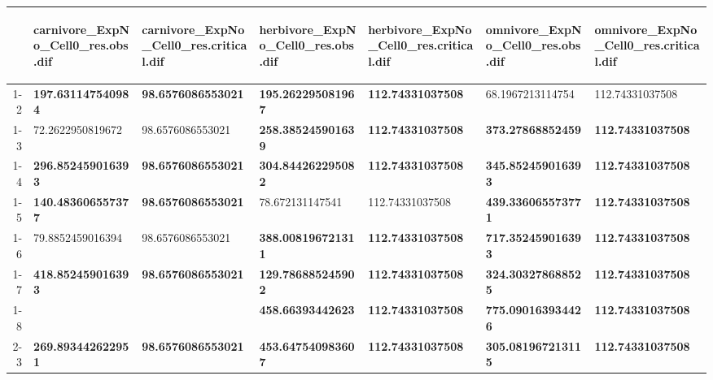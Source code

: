 \begin{table}[ht]
\centering
\begin{tabular}{rllllll}
  \toprule
 & \begin{sideways} carnivore_ExpNo_Cell0_res.obs.dif \end{sideways} & \begin{sideways} carnivore_ExpNo_Cell0_res.critical.dif \end{sideways} & \begin{sideways} herbivore_ExpNo_Cell0_res.obs.dif \end{sideways} & \begin{sideways} herbivore_ExpNo_Cell0_res.critical.dif \end{sideways} & \begin{sideways} omnivore_ExpNo_Cell0_res.obs.dif \end{sideways} & \begin{sideways} omnivore_ExpNo_Cell0_res.critical.dif \end{sideways} \\ 
  \midrule
1-2 & \textbf{197.631147540984} & \textbf{98.6576086553021} & \textbf{195.262295081967} & \textbf{112.74331037508} & 68.1967213114754 & 112.74331037508 \\ 
  1-3 & 72.2622950819672 & 98.6576086553021 & \textbf{258.385245901639} & \textbf{112.74331037508} & \textbf{373.27868852459} & \textbf{112.74331037508} \\ 
  1-4 & \textbf{296.852459016393} & \textbf{98.6576086553021} & \textbf{304.844262295082} & \textbf{112.74331037508} & \textbf{345.852459016393} & \textbf{112.74331037508} \\ 
  1-5 & \textbf{140.483606557377} & \textbf{98.6576086553021} & 78.672131147541 & 112.74331037508 & \textbf{439.336065573771} & \textbf{112.74331037508} \\ 
  1-6 & 79.8852459016394 & 98.6576086553021 & \textbf{388.008196721311} & \textbf{112.74331037508} & \textbf{717.352459016393} & \textbf{112.74331037508} \\ 
  1-7 & \textbf{418.852459016393} & \textbf{98.6576086553021} & \textbf{129.786885245902} & \textbf{112.74331037508} & \textbf{324.303278688525} & \textbf{112.74331037508} \\ 
  1-8 &  &  & \textbf{458.66393442623} & \textbf{112.74331037508} & \textbf{775.090163934426} & \textbf{112.74331037508} \\ 
  2-3 & \textbf{269.893442622951} & \textbf{98.6576086553021} & \textbf{453.647540983607} & \textbf{112.74331037508} & \textbf{305.081967213115} & \textbf{112.74331037508} \\ 

\end{tabular}
\end{table}
